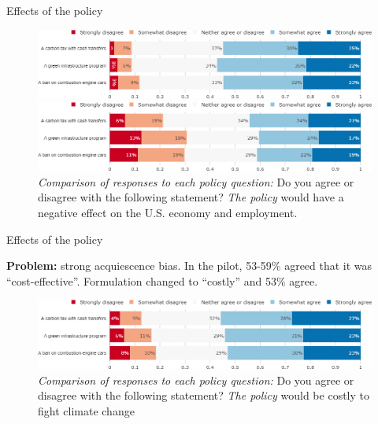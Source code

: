 \documentclass[aspectratio=169,9pt,dvipsnames]{beamer}
\begin{document}
\begin{frame}{Effects of the policy}%
\begin{figure}[h!]
\centering
\caption{\textit{Comparison of responses to each policy question:} Do you agree or disagree with the following statement? \textit{The policy} would have a large effect on the U.S. economy and employment.}
\includegraphics[width=.9\textwidth]{../figures/US/policies_large_effect_US.png}
\vspace{-.1cm}
\centering
\caption{\textit{Comparison of responses to each policy question:} Do you agree or disagree with the following statement? \textit{The policy} would have a negative effect on the U.S. economy and employment.}
\includegraphics[width=.9\textwidth]{../figures/US/policies_negative_effect_US.png}
\end{figure}
\end{frame}

\begin{frame}{Effects of the policy}%

\textbf{Problem:} strong acquiescence bias. In the pilot, 53-59\% agreed that it was ``cost-effective''. Formulation changed to ``costly'' and 53\% agree.
\begin{figure}[h!]
\vspace{-.1cm}
\centering
\caption{\textit{Comparison of responses to each policy question:} Do you agree or disagree with the following statement? \textit{The policy} would be costly to fight climate change}
\includegraphics[width=\textwidth]{../figures/US/policies_cost_effective_US.png}
\end{figure}
\end{frame}
\end{document}
